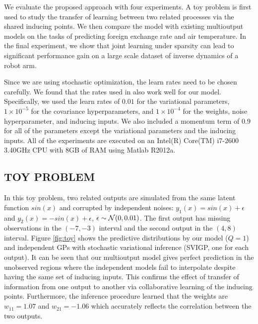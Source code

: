 We evaluate the proposed approach with four experiments.
A toy problem is first used to study the transfer of learning between two related processes via the shared inducing points.
We then compare the model with existing multioutput models on the tasks of predicting foreign exchange rate and air temperature.
In the final experiment, we show that joint learning under sparsity can lead to significant performance gain on a large scale dataset of inverse dynamics of a robot arm. 

Since we are using stochastic optimization, the learn rates need to be chosen carefully.
We found that the rates used in \citet{hensmangaussian} also work well for our model.
Specifically, we used the learn rates of $0.01$ for the variational parameters, $1 \times 10^{-5}$ for the  covariance hyperparameters, and $1 \times 10^{-4}$ for the weights, noise hyperparameter, and inducing inputs.
We also included a momentum term of $0.9$ for all of the parameters except the variational parameters and the inducing inputs.
All of the experiments are executed on an Intel(R) Core(TM) i7-2600 3.40GHz CPU with 8GB of RAM using Matlab R2012a.

\subsection{TOY PROBLEM}
In this toy problem, two related outputs are simulated from the same latent function $sin(x)$ and corrupted by independent noises: $y_1(x) = sin(x) + \epsilon$ and $y_2(x) = -sin(x) + \epsilon$, $\epsilon \sim \mathcal{N}(0,0.01)$.
The first output has missing observations in the $(-7,-3)$ interval and the second output in the $(4,8)$ interval.
Figure \ref{fig:toy} shows the predictive distributions by our model ($Q = 1$) and independent GPs with stochastic variational inference (SVIGP, one for each output).
It can be seen that our multioutput model gives perfect prediction in the unobserved regions where the independent models fail to interpolate despite having the same set of inducing inputs.
This confirms the effect of transfer of information from one output to another via collaborative learning of the inducing points.
Furthermore, the inference procedure learned that the weights are $w_{11} = 1.07$ and $w_{21} = -1.06$ which accurately reflects the correlation between the two outputs.


